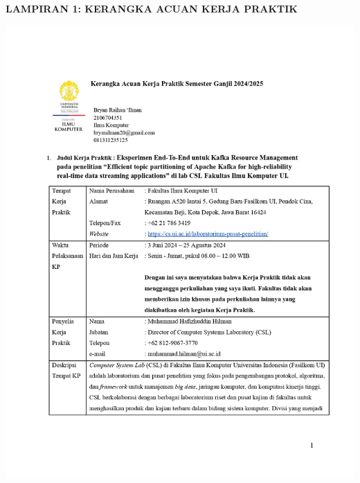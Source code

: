 \begin{center}
    \textbf{\large LAMPIRAN 1: KERANGKA ACUAN KERJA PRAKTIK}
\end{center}

\includegraphics[width=1\textwidth]{assets/pics/KAKP_Bryan Raihan Ilman_2106704351_signed_page-0001.jpg}

